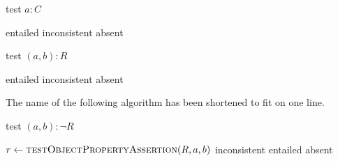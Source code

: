 \documentclass[paper.tex]{subfiles}
\begin{document}
\begin{algorithm}[H]
  \caption{test $a : C$}
  \begin{algorithmic}[1]
    \raggedright
        \State \Return entailed
        \State \Return inconsistent
      \Else
        \State \Return absent
      \EndIf
    \EndFunction
  \end{algorithmic}
\end{algorithm}

\begin{algorithm}[H]
  \caption{test $(a, b) : R$}
  \begin{algorithmic}[1]
    \raggedright
        \State \Return entailed
      \Else
            \State \Return inconsistent
          \EndIf
        \EndFor
        \State \Return absent
      \EndIf
    \EndFunction
  \end{algorithmic}
\end{algorithm}

The name of the following algorithm has been shortened to fit on one line.

\begin{algorithm}[H]
  \caption{test $(a, b) : \neg R$}
  \begin{algorithmic}[1]
    \raggedright
      \State $r \gets \Call{testObjectPropertyAssertion}{R, a, b}$
        \State \Return inconsistent
        \State \Return entailed
      \Else
        \State \Return absent
      \EndIf
    \EndFunction
  \end{algorithmic}
\end{algorithm}
\end{document}
